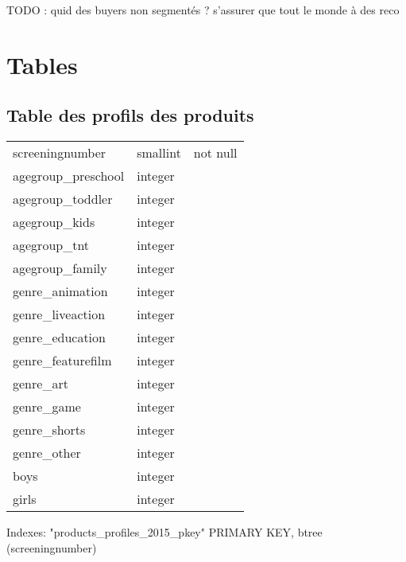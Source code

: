 \documentclass[a4paper,11pt]{article}
\begin{document}
TODO : quid des buyers non segmentés ? s'assurer que tout le monde à des reco

\section{Tables}
 \subsection{Table des profils des produits}

\begin{tabular}{lll}
 screeningnumber    & smallint & not null \\
 agegroup\_preschool & integer & \\
 agegroup\_toddler   & integer & \\
 agegroup\_kids      & integer & \\
 agegroup\_tnt       & integer & \\
 agegroup\_family    & integer & \\
 genre\_animation    & integer & \\
 genre\_liveaction   & integer & \\
 genre\_education    & integer & \\
 genre\_featurefilm  & integer & \\
 genre\_art          & integer & \\
 genre\_game         & integer & \\
 genre\_shorts       & integer & \\
 genre\_other        & integer & \\
 boys              & integer  & \\
 girls             & integer  & 
\end{tabular}

Indexes:
    "products\_profiles\_2015\_pkey" PRIMARY KEY, btree (screeningnumber)
\end{document}
